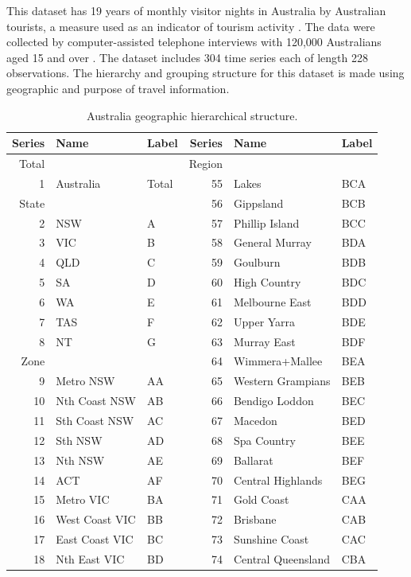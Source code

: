 \documentclass[11pt,a4paper,]{article}
\begin{document}
This dataset has 19 years of monthly visitor nights in Australia by Australian tourists, a measure used as an indicator of tourism activity \autocite{mint2018}. The data were collected by computer-assisted telephone interviews with 120,000 Australians aged 15 and over \autocite{researchAustralia2005}. The dataset includes 304 time series each of length 228 observations. The hierarchy and grouping structure for this dataset is made using geographic and purpose of travel information.

\begingroup\fontsize{9}{11}\selectfont

\begin{longtable}[t]{rllrll}
\caption{\label{tab:Australiageographicaldivision}Australia geographic hierarchical structure.}\\
\toprule
Series & Name & Label & Series & Name & Label\\
\midrule
Total &  &  & Region &  & \\
1 & Australia & Total & 55 & Lakes & BCA\\
State &  &  & 56 & Gippsland & BCB\\
2 & NSW & A & 57 & Phillip Island & BCC\\
3 & VIC & B & 58 & General Murray & BDA\\
4 & QLD & C & 59 & Goulburn & BDB\\
5 & SA & D & 60 & High Country & BDC\\
6 & WA & E & 61 & Melbourne East & BDD\\
7 & TAS & F & 62 & Upper Yarra & BDE\\
8 & NT & G & 63 & Murray East & BDF\\
Zone &  &  & 64 & Wimmera+Mallee & BEA\\
9 & Metro NSW & AA & 65 & Western Grampians & BEB\\
10 & Nth Coast NSW & AB & 66 & Bendigo Loddon & BEC\\
11 & Sth Coast NSW & AC & 67 & Macedon & BED\\
12 & Sth NSW & AD & 68 & Spa Country & BEE\\
13 & Nth NSW & AE & 69 & Ballarat & BEF\\
14 & ACT & AF & 70 & Central Highlands & BEG\\
15 & Metro VIC & BA & 71 & Gold Coast & CAA\\
16 & West Coast VIC & BB & 72 & Brisbane & CAB\\
17 & East Coast VIC & BC & 73 & Sunshine Coast & CAC\\
18 & Nth East VIC & BD & 74 & Central Queensland & CBA\\

\end{longtable}
\end{document}
